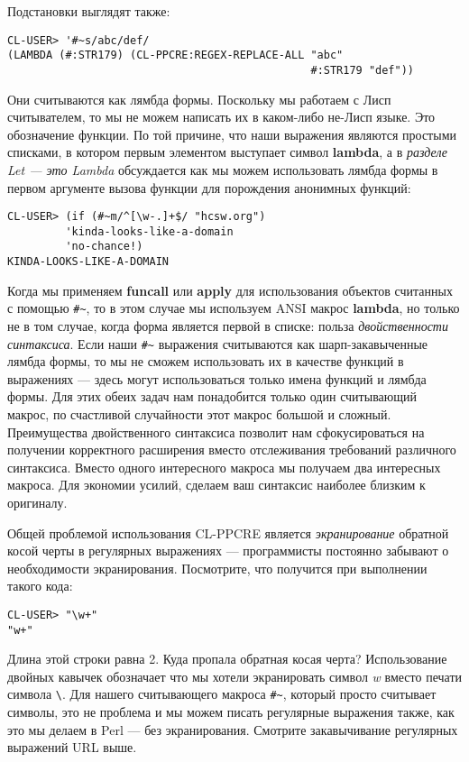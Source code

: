 Подстановки выглядят также:

\begin{verbatim}
CL-USER> '#~s/abc/def/
(LAMBDA (#:STR179) (CL-PPCRE:REGEX-REPLACE-ALL "abc" 
                                               #:STR179 "def"))
\end{verbatim}

Они считываются как лямбда формы. Поскольку мы работаем с Лисп считывателем, то мы не можем написать их в каком-либо не-Лисп языке. Это обозначение функции. По той причине, что наши выражения являются простыми списками, в котором первым элементом выступает символ \textbf{lambda}, а в \emph{разделе Let --- это Lambda} обсуждается как мы можем использовать лямбда формы в первом аргументе вызова функции для порождения анонимных функций:

\begin{verbatim}
CL-USER> (if (#~m/^[\w-.]+$/ "hcsw.org")
	     'kinda-looks-like-a-domain
	     'no-chance!)
KINDA-LOOKS-LIKE-A-DOMAIN
\end{verbatim}

Когда мы применяем \textbf{funcall} или \textbf{apply} для использования объектов считанных с помощью \verb"#~", то в этом случае мы используем ANSI макрос \textbf{lambda}, но только не в том случае, когда форма является первой в списке: польза \emph{двойственности синтаксиса}. Если наши \verb"#~" выражения считываются как шарп-закавыченные лямбда формы, то мы не сможем использовать их в качестве функций в выражениях --- здесь могут использоваться только имена функций и лямбда формы. Для этих обеих задач нам понадобится только один считывающий макрос, по счастливой случайности этот макрос большой и сложный. Преимущества двойственного синтаксиса позволит нам сфокусироваться на получении корректного расширения вместо отслеживания требований различного синтаксиса. Вместо одного интересного макроса мы получаем два интересных макроса. Для экономии усилий, сделаем ваш синтаксис наиболее близким к оригиналу.

Общей проблемой использования CL-PPCRE является \emph{экранирование} обратной косой черты в регулярных выражениях --- программисты постоянно забывают о необходимости экранирования. Посмотрите, что получится при выполнении такого кода:

\begin{verbatim}
CL-USER> "\w+"
"w+"
\end{verbatim}

Длина этой строки равна 2. Куда пропала обратная косая черта? Использование двойных кавычек обозначает что мы хотели экранировать символ \emph{w} вместо печати символа \verb"\". Для нашего считывающего макроса \verb"#~", который просто считывает символы, это не проблема и мы можем писать регулярные выражения также, как это мы делаем в Perl --- без экранирования. Смотрите закавычивание регулярных выражений URL выше.

